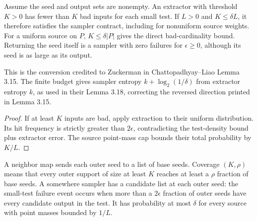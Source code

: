 \begin{theorem}
  \label{thm:lowerbounds-algebraic-extractor-sampler}
  \leanok
  Assume the seed and output sets are nonempty. An extractor with
  threshold $K>0$ has fewer than $K$ bad inputs for each small test.
  If $L>0$ and $K\le\delta L$, it therefore satisfies the sampler
  contract, including for nonuniform source weights. For a uniform
  source on $P$, $K\le\delta|P|$ gives the direct bad-cardinality bound.
  Returning the seed itself is a sampler with zero failures for
  $\epsilon\ge0$, although its seed is as large as its output.

  This is the conversion credited to Zuckerman in Chattopadhyay--Liao
  Lemma 3.15. The finite budget gives sampler entropy
  $k+\log_2(1/\delta)$ from extractor entropy $k$, as used in their
  Lemma 3.18, correcting the reversed direction printed in Lemma 3.15.
\end{theorem}
\begin{proof}
  \leanok
  If at least $K$ inputs are bad, apply extraction to their uniform
  distribution. Its hit frequency is strictly greater than $2\epsilon$,
  contradicting the test-density bound plus extractor error. The source
  point-mass cap bounds their total probability by $K/L$.
\end{proof}

\begin{definition}
  \label{def:lowerbounds-algebraic-sampler-amplification}
  \leanok
  A neighbor map sends each outer seed to a list of base seeds. Coverage
  $(K,\rho)$ means that every outer support of size at least $K$ reaches
  at least a $\rho$ fraction of base seeds. A somewhere sampler has a
  candidate list at each outer seed: the small-test failure event occurs
  when more than a $2\epsilon$ fraction of outer seeds have every
  candidate output in the test. It has probability at most $\delta$
  for every source with point masses bounded by $1/L$.
\end{definition}

